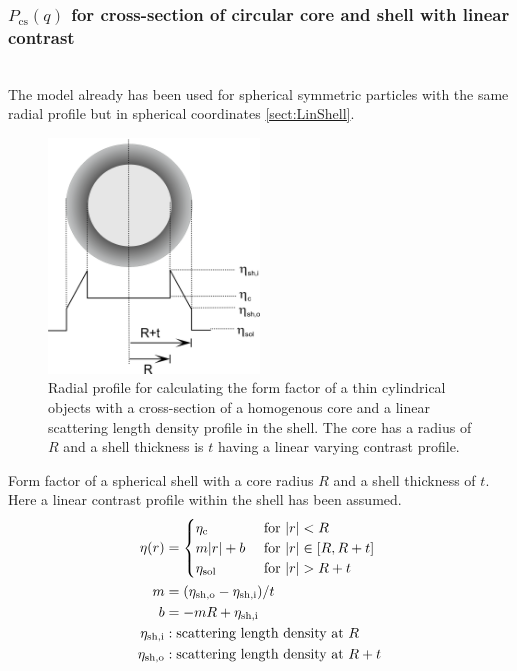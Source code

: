 \subsubsection{$P_\mathrm{cs}(q)$ for cross-section of circular core and shell with linear contrast } ~\\
\label{plugin:Pcs:cyl_LinSh}
The model already has been used for spherical symmetric particles with the same radial profile but in spherical coordinates \ref{sect:LinShell}.
\begin{figure}[htb]
\begin{center}
\includegraphics[width=0.5\textwidth,height=0.533\textwidth]{../images/form_factor/anisotropic/LinShellCylSketchProfile.png}
\end{center}
\caption{Radial profile for calculating the form factor of a thin cylindrical objects with a cross-section of a homogenous
core and a linear scattering length density profile in the shell.  The core has a radius of $R$
and a shell thickness is $t$ having a linear varying contrast
profile.} \label{LinShellCylProfile}
\end{figure}
Form factor of a spherical shell with a core radius $R$ and a
shell thickness of $t$. Here a linear contrast profile
within the shell has been assumed.
\begin{align}
\eta(r)      & =
\begin{cases}
\eta_\text{c} & \text{~for~} \abs{r}<R \\
m \abs{r} + b  & \text{~for~} \abs{r} \in [R,R+t] \\
\eta_\text{sol}  & \text{~for~} \abs{r}>R+t
\end{cases}\\
m           & = (\eta_\text{sh,o}-\eta_\text{sh,i}) / t \\
b           & = -m R + \eta_\text{sh,i} \\
\eta_\text{sh,i}  & : \text{scattering length density at $R$} \nonumber \\
\eta_\text{sh,o}  & : \text{scattering length density at $R+t$} \nonumber \\\
\nonumber
\end{align}
